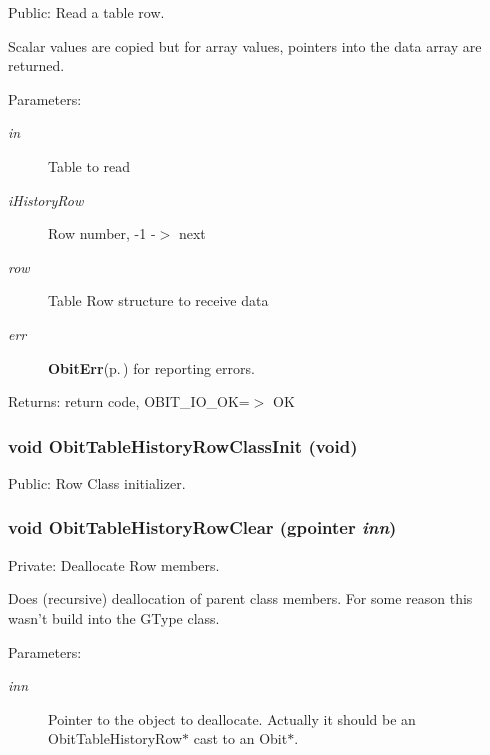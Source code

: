 Public: Read a table row. 

Scalar values are copied but for array values, pointers into the data array are returned. \begin{Desc}
\item[Parameters:]
\begin{description}
\item[{\em in}]Table to read \item[{\em i\-History\-Row}]Row number, -1 -$>$ next \item[{\em row}]Table Row structure to receive data \item[{\em err}]{\bf Obit\-Err}{\rm (p.\,\pageref{structObitErr})} for reporting errors. \end{description}
\end{Desc}
\begin{Desc}
\item[Returns:]return code, OBIT\_\-IO\_\-OK=$>$ OK \end{Desc}
\subsubsection{\setlength{\rightskip}{0pt plus 5cm}void Obit\-Table\-History\-Row\-Class\-Init (void)}\label{ObitTableHistory_8c_a26}


Public: Row Class initializer. 

\subsubsection{\setlength{\rightskip}{0pt plus 5cm}void Obit\-Table\-History\-Row\-Clear (gpointer {\em inn})}\label{ObitTableHistory_8c_a7}


Private: Deallocate Row members. 

Does (recursive) deallocation of parent class members. For some reason this wasn't build into the GType class. \begin{Desc}
\item[Parameters:]
\begin{description}
\item[{\em inn}]Pointer to the object to deallocate. Actually it should be an Obit\-Table\-History\-Row$\ast$ cast to an Obit$\ast$. \end{description}
\end{Desc}
